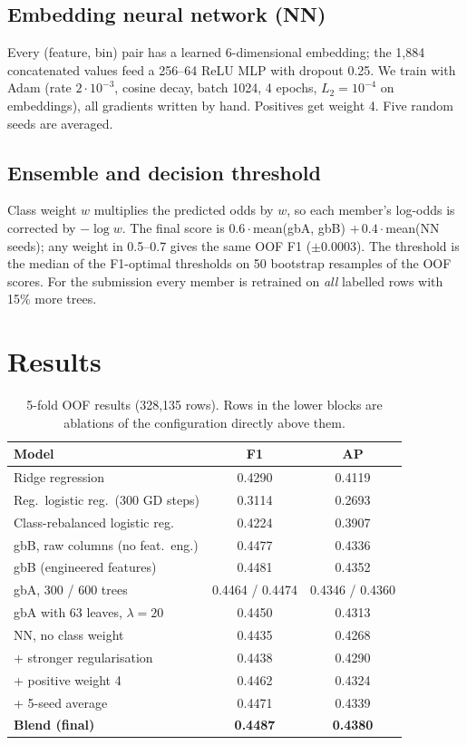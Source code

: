 \documentclass[10pt,conference,compsocconf]{IEEEtran}
\begin{document}
\subsection{Embedding neural network (NN)}
Every (feature, bin) pair has a learned 6-dimensional embedding; the 1,884 concatenated
values feed a 256--64 ReLU MLP with dropout 0.25. We train with Adam (rate $2\cdot10^{-3}$,
cosine decay, batch 1024, 4 epochs, $L_2=10^{-4}$ on embeddings), all gradients written by
hand. Positives get weight 4. Five random seeds are averaged.

\subsection{Ensemble and decision threshold}
Class weight $w$ multiplies the predicted odds by $w$, so each member's log-odds is
corrected by $-\log w$. The final score is $0.6\cdot$mean(gbA, gbB) $+\,0.4\cdot$mean(NN
seeds); any weight in 0.5--0.7 gives the same OOF F1 ($\pm0.0003$). The threshold is the
median of the F1-optimal thresholds on 50 bootstrap resamples of the OOF scores. For the
submission every member is retrained on \emph{all} labelled rows with 15\% more trees.

\section{Results}
\begin{table}[t]
\centering\caption{5-fold OOF results (328,135 rows). Rows in the lower blocks are ablations
of the configuration directly above them.}\label{tab:res}
\footnotesize\setlength{\tabcolsep}{4pt}
\begin{tabular}{lcc}
\toprule
Model & F1 & AP\\
\midrule
Ridge regression & 0.4290 & 0.4119\\
Reg.\ logistic reg.\ (300 GD steps) & 0.3114 & 0.2693\\
Class-rebalanced logistic reg. & 0.4224 & 0.3907\\
\midrule
gbB, raw columns (no feat.\ eng.) & 0.4477 & 0.4336\\
gbB (engineered features) & 0.4481 & 0.4352\\
gbA, 300 / 600 trees & 0.4464 / 0.4474 & 0.4346 / 0.4360\\
gbA with 63 leaves, $\lambda=20$ & 0.4450 & 0.4313\\
\midrule
NN, no class weight & 0.4435 & 0.4268\\
\quad + stronger regularisation & 0.4438 & 0.4290\\
\quad + positive weight 4 & 0.4462 & 0.4324\\
\quad + 5-seed average & 0.4471 & 0.4339\\
\midrule
\textbf{Blend (final)} & \textbf{0.4487} & \textbf{0.4380}\\
\bottomrule
\end{tabular}
\end{table}
\end{document}
